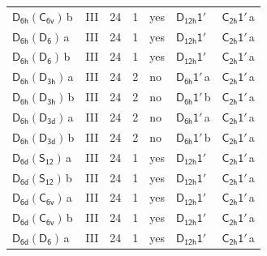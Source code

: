 \documentclass[10pt,a4paper]{article}
\numberwithin{equation}{section}
\newcommand{\grp}[1]{\mathsf{#1}}
\newcommand{\clsletter}[1]{\,{\scriptsize\color{black!55}#1}}
\begin{document}
{\begin{longtable}{@{}llrrlll@{}}
\href{D6h-C6v.pdf}{$\grp{D_{6h}}(\grp{C_{6v}})$}\clsletter{b} & III & 24 & 1 & yes & \href{D12h-1p.pdf}{$\grp{D_{12h}1'}$} & \href{C2h-1p.pdf}{$\grp{C_{2h}1'}$}\clsletter{a}\\
\href{D6h-D6.pdf}{$\grp{D_{6h}}(\grp{D_{6}})$}\clsletter{a} & III & 24 & 1 & yes & \href{D12h-1p.pdf}{$\grp{D_{12h}1'}$} & \href{C2h-1p.pdf}{$\grp{C_{2h}1'}$}\clsletter{a}\\
\href{D6h-D6.pdf}{$\grp{D_{6h}}(\grp{D_{6}})$}\clsletter{b} & III & 24 & 1 & yes & \href{D12h-1p.pdf}{$\grp{D_{12h}1'}$} & \href{C2h-1p.pdf}{$\grp{C_{2h}1'}$}\clsletter{a}\\
\href{D6h-D3h.pdf}{$\grp{D_{6h}}(\grp{D_{3h}})$}\clsletter{a} & III & 24 & 2 & no & \href{D6h-1p.pdf}{$\grp{D_{6h}1'}$}\clsletter{a} & \href{C2h-1p.pdf}{$\grp{C_{2h}1'}$}\clsletter{a}\\
\href{D6h-D3h.pdf}{$\grp{D_{6h}}(\grp{D_{3h}})$}\clsletter{b} & III & 24 & 2 & no & \href{D6h-1p.pdf}{$\grp{D_{6h}1'}$}\clsletter{b} & \href{C2h-1p.pdf}{$\grp{C_{2h}1'}$}\clsletter{a}\\
\href{D6h-D3d.pdf}{$\grp{D_{6h}}(\grp{D_{3d}})$}\clsletter{a} & III & 24 & 2 & no & \href{D6h-1p.pdf}{$\grp{D_{6h}1'}$}\clsletter{a} & \href{C2h-1p.pdf}{$\grp{C_{2h}1'}$}\clsletter{a}\\
\href{D6h-D3d.pdf}{$\grp{D_{6h}}(\grp{D_{3d}})$}\clsletter{b} & III & 24 & 2 & no & \href{D6h-1p.pdf}{$\grp{D_{6h}1'}$}\clsletter{b} & \href{C2h-1p.pdf}{$\grp{C_{2h}1'}$}\clsletter{a}\\
\href{D6d-S12.pdf}{$\grp{D_{6d}}(\grp{S_{12}})$}\clsletter{a} & III & 24 & 1 & yes & \href{D12h-1p.pdf}{$\grp{D_{12h}1'}$} & \href{C2h-1p.pdf}{$\grp{C_{2h}1'}$}\clsletter{a}\\
\href{D6d-S12.pdf}{$\grp{D_{6d}}(\grp{S_{12}})$}\clsletter{b} & III & 24 & 1 & yes & \href{D12h-1p.pdf}{$\grp{D_{12h}1'}$} & \href{C2h-1p.pdf}{$\grp{C_{2h}1'}$}\clsletter{a}\\
\href{D6d-C6v.pdf}{$\grp{D_{6d}}(\grp{C_{6v}})$}\clsletter{a} & III & 24 & 1 & yes & \href{D12h-1p.pdf}{$\grp{D_{12h}1'}$} & \href{C2h-1p.pdf}{$\grp{C_{2h}1'}$}\clsletter{a}\\
\href{D6d-C6v.pdf}{$\grp{D_{6d}}(\grp{C_{6v}})$}\clsletter{b} & III & 24 & 1 & yes & \href{D12h-1p.pdf}{$\grp{D_{12h}1'}$} & \href{C2h-1p.pdf}{$\grp{C_{2h}1'}$}\clsletter{a}\\
\href{D6d-D6.pdf}{$\grp{D_{6d}}(\grp{D_{6}})$}\clsletter{a} & III & 24 & 1 & yes & \href{D12h-1p.pdf}{$\grp{D_{12h}1'}$} & \href{C2h-1p.pdf}{$\grp{C_{2h}1'}$}\clsletter{a}\\

\end{longtable}}
\end{document}
